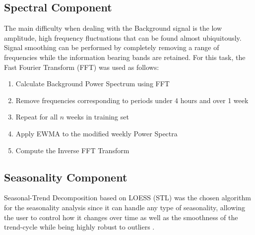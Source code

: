 \documentclass[letterpaper, 10 pt, conference]{ieeeconf}  %
\begin{document}
\subsection{Spectral Component}
The main difficulty when dealing with the Background signal is the low amplitude, high frequency fluctuations that can be found almost ubiquitously. 
Signal smoothing can be performed by completely removing a range of frequencies while the information bearing bands are retained. For this task, the Fast Fourier Transform (FFT) \cite{FFT} was used as follows:
\begin{enumerate}

	\item Calculate Background Power Spectrum using FFT
	\item Remove frequencies corresponding to periods under 4 hours and over 1 week
	\item Repeat for all $n$ weeks in training set
    \item Apply EWMA to the modified weekly Power Spectra
	\item Compute the Inverse FFT Transform

\end{enumerate}
\subsection{Seasonality Component}
Seasonal-Trend Decomposition based on LOESS (STL) \cite{STL} was the chosen algorithm for the seasonality analysis since it can handle any type of seasonality, allowing the user to control how it changes over time as well as the smoothness of the trend-cycle while being highly robust to outliers \cite{forecasting}.\\
\end{document}
